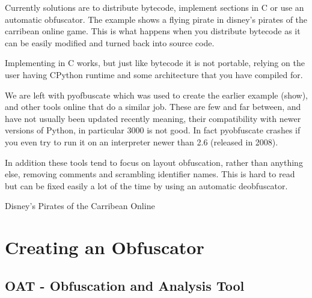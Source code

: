 Currently solutions are to distribute bytecode, implement sections in C or use an automatic obfuscator. The example shows a flying pirate in disney's pirates of
the carribean online game. This is what happens when you distribute bytecode as it can be easily modified and turned back into source code. 

Implementing in C works, but just like bytecode it is not portable, relying on the user having CPython runtime and some architecture that you have compiled for.

We are left with pyofbuscate which was used to create the earlier example (show), and other tools online that do a similar job. These are few and far between, and have
not usually been updated recently meaning, their compatibility with newer versions of Python, in particular 3000 is not good. In fact pyobfuscate crashes if you
even try to run it on an interpreter newer than 2.6 (released in 2008).

In addition these tools tend to focus on layout obfuscation, rather than anything else, removing comments and scrambling identifier names. This is hard to read
but can be fixed easily a lot of the time by using an automatic deobfuscator.

\begin{frame}[plain]{Disney's Pirates of the Carribean Online}
\end{frame}





\section{Creating an Obfuscator}

\subsection{OAT - Obfuscation and Analysis Tool}

